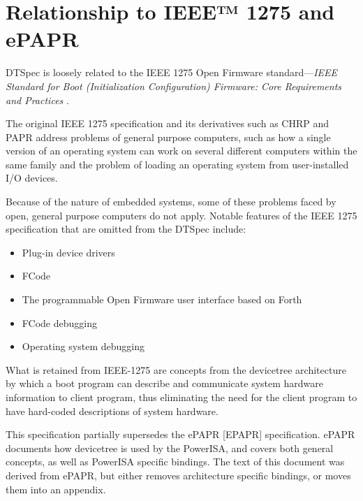 \documentclass[a4paper,10pt,oneside]{sphinxmanual}
\begin{document}
\section{Relationship to IEEE™ 1275 and ePAPR}
\label{introduction:relationship-to-ieee-1275-and-epapr}
DTSpec is loosely related to the IEEE 1275 Open Firmware
standard—\emph{IEEE Standard for Boot (Initialization Configuration)
Firmware: Core Requirements and Practices} \label{introduction:id1}{\hyperref[references:ieee1275]{\crossref{{[}IEEE1275{]}}}}.

The original IEEE 1275 specification and its derivatives such as CHRP \label{introduction:id2}{\hyperref[references:chrp]{\crossref{{[}CHRP{]}}}}
and PAPR \label{introduction:id3}{\hyperref[references:papr]{\crossref{{[}PAPR{]}}}} address problems of general purpose computers, such as how a
single version of an operating system can work on several different
computers within the same family and the problem of loading an operating
system from user-installed I/O devices.

Because of the nature of embedded systems, some of these problems faced
by open, general purpose computers do not apply. Notable features of the
IEEE 1275 specification that are omitted from the DTSpec include:
\begin{itemize}
\item {} 
Plug-in device drivers

\item {} 
FCode

\item {} 
The programmable Open Firmware user interface based on Forth

\item {} 
FCode debugging

\item {} 
Operating system debugging

\end{itemize}

What is retained from IEEE-1275 are concepts from the devicetree
architecture by which a boot program can describe and communicate system
hardware information to client program, thus eliminating the need for
the client program to have hard-coded descriptions of system hardware.

This specification partially supersedes the ePAPR {[}EPAPR{]} specification.
ePAPR documents how devicetree is used by the PowerISA, and covers both
general concepts, as well as PowerISA specific bindings.
The text of this document was derived from ePAPR, but either removes architecture specific bindings, or moves them into an appendix.
\end{document}
